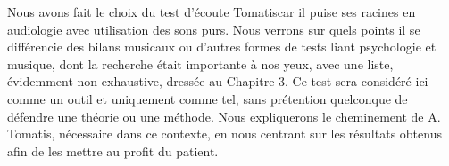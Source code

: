  
  Nous  avons fait le choix du test d'écoute Tomatis\textsuperscript \textregistered  car il 
 puise ses racines  en 
 audiologie avec utilisation des sons purs.
 Nous verrons sur quels points il se différencie des bilans musicaux 
 ou 
 d'autres formes de tests liant psychologie et musique, dont la recherche était importante à nos yeux, 
 avec une liste, 
 évidemment non exhaustive, dressée au Chapitre 3. 
  Ce test sera considéré ici 
 comme un outil et uniquement comme tel, sans prétention quelconque de défendre une théorie ou une 
 méthode. Nous expliquerons le cheminement de A. Tomatis, nécessaire dans ce contexte, en  nous 
 centrant sur les 
 résultats obtenus afin de les mettre 
 au profit du patient.
 

